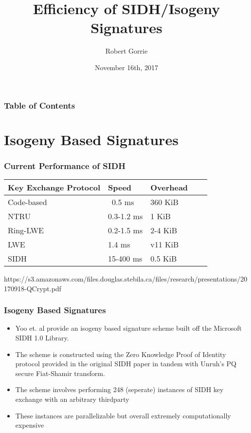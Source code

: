 \documentclass{beamer}
\title[SIDH]{Efficiency of SIDH/Isogeny Signatures}
\author{Robert Gorrie}
\institute[Comp Sci 2S03]{Department of Computing \& Software, McMaster University}
\date{November 16th, 2017}
\begin{document}
\begin{frame}
\titlepage
\end{frame}

\begin{frame}
\frametitle{Table of Contents}
\tableofcontents
\end{frame}


\section{Isogeny Based Signatures}


\begin{frame}
\frametitle{Current Performance of SIDH}
\begin{center}
\begin{tabular}{@{}lllll@{}}
	Key Exchange Protocol & Speed & Overhead\\
	\midrule
	Code-based & ~0.5 ms & 360 KiB\\
	NTRU & 0.3-1.2 ms & 1 KiB\\
	Ring-LWE & 0.2-1.5 ms & 2-4 KiB\\
	LWE & 1.4 ms & v11 KiB\\
	\midrule
	SIDH & 15-400 ms & 0.5 KiB\\
\end{tabular}
\begingroup \fontsize{8pt}{8pt}\selectfont
https://s3.amazonaws.com/files.douglas.stebila.ca/files/research/presentations/20170918-QCrypt.pdf
\endgroup
\end{center}
\end{frame}

\begin{frame}
\frametitle{Isogeny Based Signatures}
\begin{itemize}
\item Yoo et. al provide an isogeny based signature scheme built off the Microsoft SIDH 1.0 Library.
\item The scheme is constructed using the Zero Knowledge Proof of Identity protocol provided in the original SIDH paper in tandem with Unruh's PQ secure Fiat-Shamir transform.
\item The scheme involves performing 248 (seperate) instances of SIDH key exchange with an arbitrary thirdparty
\item These instances are parallelizable but overall extremely computationally expensive
\end{itemize}
\end{frame}
\end{document}
